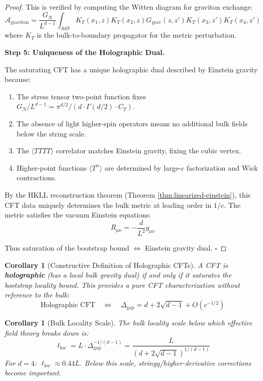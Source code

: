 \documentclass[12pt,a4paper]{article}
\newtheorem{corollary}[theorem]{Corollary}
\begin{document}
\begin{proof}
This is verified by computing the Witten diagram for graviton exchange:
\begin{equation}
\mathcal{A}_{\text{graviton}} = \frac{G_N}{L^{d-1}} \int_{AdS} K_T(x_1, z) K_T(x_2, z) G_{\text{grav}}(z, z') K_T(x_3, z') K_T(x_4, z')
\end{equation}
where $K_T$ is the bulk-to-boundary propagator for the metric perturbation.

\textbf{Step 5: Uniqueness of the Holographic Dual.}

The saturating CFT has a unique holographic dual described by Einstein gravity because:
\begin{enumerate}
    \item The stress tensor two-point function fixes $G_N/L^{d-1} = \pi^{d/2}/(d \cdot \Gamma(d/2) \cdot C_T)$.
    \item The absence of light higher-spin operators means no additional bulk fields below the string scale.
    \item The $\langle TTTT \rangle$ correlator matches Einstein gravity, fixing the cubic vertex.
    \item Higher-point functions $\langle T^n \rangle$ are determined by large-$c$ factorization and Wick contractions.
\end{enumerate}

By the HKLL reconstruction theorem (Theorem \ref{thm:linearized-einstein}), this CFT data uniquely determines the bulk metric at leading order in $1/c$. The metric satisfies the vacuum Einstein equations:
\begin{equation}
R_{\mu\nu} = -\frac{d}{L^2} g_{\mu\nu}
\end{equation}

Thus saturation of the bootstrap bound $\Leftrightarrow$ Einstein gravity dual. $\square$
\end{proof}

\begin{corollary}[Constructive Definition of Holographic CFTs]
A CFT is \textbf{holographic} (has a local bulk gravity dual) if and only if it saturates the bootstrap locality bound. This provides a pure CFT characterization without reference to the bulk:
\begin{equation}
\boxed{\text{Holographic CFT} \quad \Leftrightarrow \quad \Delta_{\text{gap}} = d + 2\sqrt{d-1} + O(c^{-1/2})}
\end{equation}
\end{corollary}

\begin{corollary}[Bulk Locality Scale]
The bulk locality scale below which effective field theory breaks down is:
\begin{equation}
\ell_{\text{loc}} = L \cdot \Delta_{\text{gap}}^{-1/(d-1)} = \frac{L}{(d + 2\sqrt{d-1})^{1/(d-1)}}
\end{equation}
For $d = 4$: $\ell_{\text{loc}} \approx 0.44 L$. Below this scale, stringy/higher-derivative corrections become important.
\end{corollary}
\end{document}
